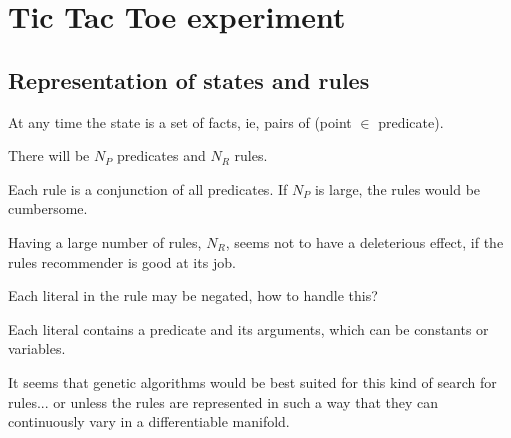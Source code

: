 \chapter{Tic Tac Toe experiment}\label{chap:TicTacToe}

\section{Representation of states and rules}

At any time the state is a set of facts, ie, pairs of (point $\in$ predicate).

There will be $N_P$ predicates and $N_R$ rules.

Each rule is a conjunction of all predicates.  If $N_P$ is large, the rules would be cumbersome.

Having a large number of rules, $N_R$, seems not to have a deleterious effect, if the rules recommender is good at its job.

Each literal in the rule may be negated, how to handle this?

Each literal contains a predicate and its arguments, which can be constants or variables.

It seems that genetic algorithms would be best suited for this kind of search for rules...  or unless the rules are represented in such a way that they can continuously vary in a differentiable manifold.
